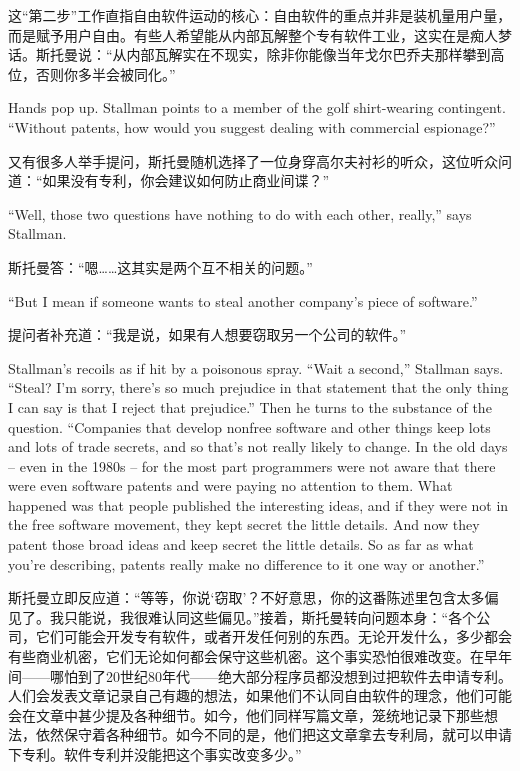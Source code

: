 \ifdefined\chs
这``第二步''工作直指自由软件运动的核心：自由软件的重点并非是装机量用户量，而是赋予用户自由。有些人希望能从内部瓦解整个专有软件工业，这实在是痴人梦话。斯托曼说：``从内部瓦解实在不现实，除非你能像当年戈尔巴乔夫那样攀到高位，否则你多半会被同化。''
\fi

\ifdefined\eng
Hands pop up. Stallman points to a member of the golf shirt-wearing contingent. ``Without patents, how would you suggest dealing with commercial espionage?''
\fi

\ifdefined\chs
又有很多人举手提问，斯托曼随机选择了一位身穿高尔夫衬衫的听众，这位听众问道：``如果没有专利，你会建议如何防止商业间谍？''
\fi

\ifdefined\eng
``Well, those two questions have nothing to do with each other, really,'' says Stallman.
\fi

\ifdefined\chs
斯托曼答：``嗯……这其实是两个互不相关的问题。''
\fi

\ifdefined\eng
``But I mean if someone wants to steal another company's piece of software.''
\fi

\ifdefined\chs
提问者补充道：``我是说，如果有人想要窃取另一个公司的软件。''
\fi

\ifdefined\eng
Stallman's recoils as if hit by a poisonous spray. ``Wait a second,'' Stallman says. ``Steal? I'm sorry, there's so much prejudice in that statement that the only thing I can say is that I reject that prejudice.\ifdefined\vtwo '' Then he turns to the substance of the question. ``\fi Companies that develop nonfree software and other things keep lots and lots of trade secrets, and so that's not really likely to change. In the old days -- even in the 1980s -- for the most part programmers were not aware that there were even software patents and were paying no attention to them. What happened was that people published the interesting ideas, and if they were not in the free software movement, they kept secret the little details. And now they patent those broad ideas and keep secret the little details. So as far as what you're describing, patents really make no difference to it one way or another.''
\fi

\ifdefined\chs
斯托曼立即反应道：``等等，你说`窃取'？不好意思，你的这番陈述里包含太多偏见了。我只能说，我很难认同这些偏见。\ifdefined\vtwo ''接着，斯托曼转向问题本身：``\fi 各个公司，它们可能会开发专有软件，或者开发任何别的东西。无论开发什么，多少都会有些商业机密，它们无论如何都会保守这些机密。这个事实恐怕很难改变。在早年间——哪怕到了20世纪80年代——绝大部分程序员都没想到过把软件去申请专利。人们会发表文章记录自己有趣的想法，如果他们不认同自由软件的理念，他们可能会在文章中甚少提及各种细节。如今，他们同样写篇文章，笼统地记录下那些想法，依然保守着各种细节。如今不同的是，他们把这文章拿去专利局，就可以申请下专利。软件专利并没能把这个事实改变多少。''
\fi

